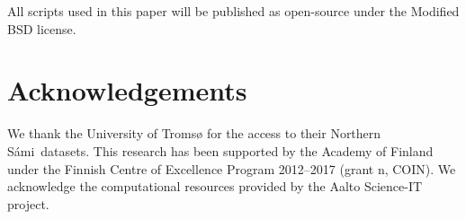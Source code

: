\documentclass[b5paper]{article}
\newcommand{\note}[1]{{\textcolor{blue}{#1}}}
\newcommand{\ns}{Northern Sámi}
\begin{document}
All scripts used in this paper will be published as open-source under the Modified BSD license. 





\section{Acknowledgements} 
We thank the University of Tromsø for the access to their \ns\ datasets.  This research has been supported by the Academy of Finland under the Finnish Centre of Excellence Program 2012--2017 (grant n, COIN).
We acknowledge the computational resources provided by the Aalto Science-IT project. 




 
\end{document}
